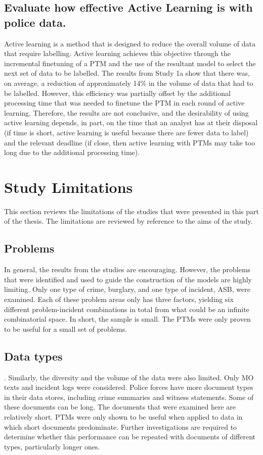 \subsection{Evaluate how effective Active Learning is with police data.}  Active learning is a method that is designed to reduce the overall volume of data that require labelling. Active learning achieves this objective through the incremental finetuning of a PTM and the use of the resultant model to select the next set of data to be labelled. The results from Study 1a show that there was, on average, a reduction of approximately 14\% in the volume of data that had to be labelled. However, this efficiency was partially offset by the additional processing time that was needed to finetune the PTM in each round of active learning. Therefore, the results are not conclusive, and the desirability of using active learning depends, in part, on the time that an analyst has at their disposal (if time is short, active learning is useful because there are fewer data to label) and the relevant deadline (if close, then active learning with PTMs may take too long due to the additional processing time).

\section{Study Limitations} This section reviews the limitations of the studies that were presented in this part of the thesis. The limitations are reviewed by reference to the aims of the study.

\subsection{Problems} In general, the results from the studies are encouraging. However, the problems that were identified and used to guide the construction of the models are highly limiting. Only one type of crime, burglary, and one type of incident, ASB, were examined. Each of these problem areas only has three factors, yielding six different problem-incident combinations in total from what could be an infinite combinatorial space. In short, the sample is small. The PTMs were only proven to be useful for a small set of problems.

\subsection{Data types}. Similarly, the diversity and the volume of the data were also limited. Only MO texts and incident logs were considered. Police forces have more document types in their data stores, including crime summaries and witness statements. Some of these documents can be long. The documents that were examined here are relatively short. PTMs were only shown to be useful when applied to data in which short documents predominate. Further investigations are required to determine whether this performance can be repeated with documents of different types, particularly longer ones.

